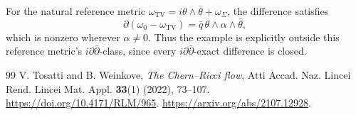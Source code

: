 \documentclass[11pt,a4paper]{article}
\theoremstyle{remark}
\begin{document}
For the natural reference metric $\omega_{\mathrm{TV}}=i\theta\wedge\bar\theta+\omega_\Sigma$, the difference satisfies
\[
\partial(\omega_0-\omega_{\mathrm{TV}})
=\bar q\,\theta\wedge\alpha\wedge\bar\theta,
\]
which is nonzero wherever $\alpha\ne0$. Thus the example is explicitly outside this reference metric's $i\partial\bar\partial$-class, since every $i\partial\bar\partial$-exact difference is closed.

\begingroup\small
\begin{thebibliography}{99}
 V. Tosatti and B. Weinkove, \emph{The Chern--Ricci flow}, Atti Accad. Naz. Lincei Rend. Lincei Mat. Appl. \textbf{33}(1) (2022), 73--107. \url{https://doi.org/10.4171/RLM/965}. \url{https://arxiv.org/abs/2107.12928}.
\end{thebibliography}
\endgroup
\end{document}
